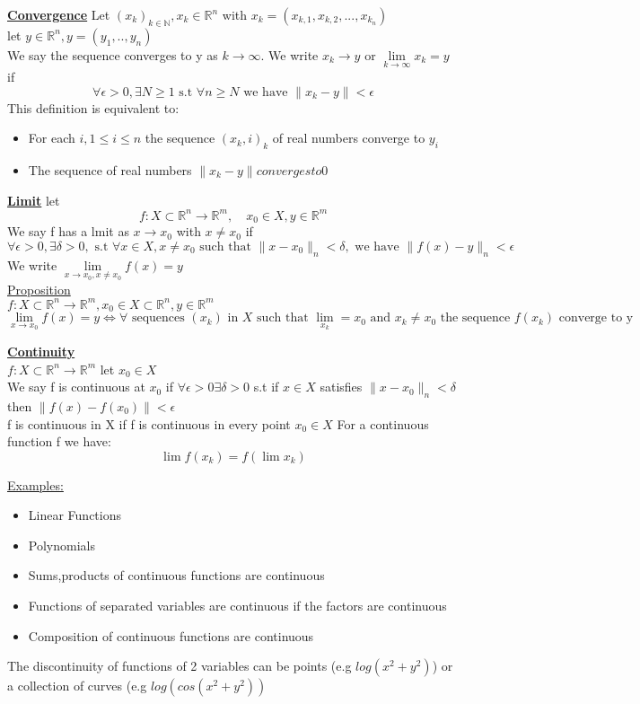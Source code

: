 \documentclass[8pt]{extreport}
\newcommand{\R}{\mathbb{R}}
\newcommand{\N}{\mathbb{N}}
\begin{document}
\underline{\textbf{Convergence}}
Let $(x_k)_{k\in \N}, x_k \in \R^n$ with $x_k = (x_{k,1},x_{k,2},...,x_{k_n})$\\
let $y \in \R^n, y =(y_1,..,y_n)$\\
We say the sequence converges to y as $k \to \infty$. We write $x_k \to y$ or $\lim\limits_{k \to \infty} x_k = y$ if
$$\forall \epsilon > 0, \exists N \geq 1 \text{ s.t } \forall n \geq N \text{ we have } \|x_k - y \| < \epsilon$$
This definition is equivalent to:\\
\begin{itemize}

 \item For each $i, 1 \leq i \leq n$ the sequence $(x_k,i)_k$ of real numbers converge to $y_i$
\item The sequence of real numbers $\|x_k -y \| converges to 0$  
\end{itemize}

\underline{\textbf{Limit}}
let
$$f: X \subset \R^n \to \R^m, \quad x_0 \in X, y \in \R^m$$
We say f has a lmit as $x \to x_0$ with $x \neq x_0$ if
$$ \forall \epsilon > 0, \exists \delta > 0, \text{ s.t } \forall x \in X, x \neq x_0 \text{ such that } \|x-x_0\|_n < \delta, \text{ we have } \|f(x) -y \|_n < \epsilon$$
We write $\lim\limits_{x \to x_0, x \neq x_0} f(x) = y$\\

\underline{Proposition}\\
$f:X \subset \R^n \to \R^m, x_0 \in X \subset \R^n, y \in \R^m$
$$\lim\limits_{x \to x_0}f(x) = y \iff \forall \text{ sequences } (x_k) \text{ in } X \text{ such that } \lim_{x_k}=x_0 \text{ and } x_k \neq x_0 \text{ the sequence } f(x_k) \text{ converge to y }$$

\underline{\textbf{Continuity}}\\
$f: X \subset \R^n \to \R^m$ let $x_0 \in X$\\
We say f is continuous at $x_0$ if $\forall \epsilon > 0 \exists \delta > 0$ s.t if $x \in X$ satisfies $\|x-x_0\|_n < \delta$ then $\|f(x) - f(x_0) \| < \epsilon$\\
f is continuous in X if f is continuous in every point $x_0 \in X$
For a continuous function f we have:
$$ \lim f(x_k) = f(\lim x_k)$$

\underline{Examples:}
\begin{itemize}
\item Linear Functions
\item Polynomials
\item Sums,products of continuous functions are continuous
\item Functions of separated variables are continuous if the factors are continuous
\item Composition of continuous functions are continuous
\end{itemize}
The discontinuity of functions of 2 variables can be points (e.g $log(x^2+y^2)$) or a collection of curves (e.g $log(cos(x^2+y^2))$\\
\end{document}
